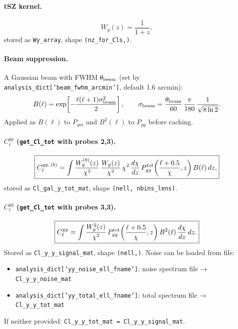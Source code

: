 \documentclass[12pt,a4paper]{article}
\newcommand{\code}[1]{\texttt{\small #1}}
\newcommand{\param}[1]{\texttt{\small #1}}
\begin{document}
\paragraph{tSZ kernel.}
\begin{equation}
  W_y(z) = \frac{1}{1+z},
\end{equation}
stored as \code{Wy\_array}, shape \code{(nz\_for\_Cls,)}.

\paragraph{Beam suppression.}
A Gaussian beam with FWHM $\theta_{\rm beam}$ (set by
\param{analysis\_dict['beam\_fwhm\_arcmin']}, default 1.6 arcmin):
\begin{equation}
  B(\ell) = \exp\!\left[-\frac{\ell(\ell+1)\sigma_{\rm beam}^2}{2}\right],
  \qquad \sigma_{\rm beam} = \frac{\theta_{\rm beam}}{60}\,\frac{\pi}{180}\,
  \frac{1}{\sqrt{8\ln 2}}.
\end{equation}
Applied as $B(\ell)$ to $P_{ym}$ and $B^2(\ell)$ to $P_{yy}$ before caching.

\paragraph{$C_\ell^{gy}$ (\code{get\_Cl\_tot} with probes 2,3).}
\begin{equation}
  \boxed{C_\ell^{gy,\,(b)} = \int
  \frac{W_g^{(b)}(z)}{\chi^2}
  \,\frac{W_y(z)}{\chi^2}
  \,\chi^2\,\frac{d\chi}{dz}\,
  P^{\rm tot}_{gy}\!\left(\frac{\ell+0.5}{\chi},z\right)B(\ell)\,dz,}
\end{equation}
stored as \code{Cl\_gal\_y\_tot\_mat}, shape \code{(nell, nbins\_lens)}.

\paragraph{$C_\ell^{yy}$ (\code{get\_Cl\_tot} with probes 3,3).}
\begin{equation}
  \boxed{C_\ell^{yy} = \int
  \frac{W_y^2(z)}{\chi^2}
  \,P^{\rm tot}_{yy}\!\left(\frac{\ell+0.5}{\chi},z\right)B^2(\ell)\,\frac{d\chi}{dz}\,dz.}
\end{equation}
Stored as \code{Cl\_y\_y\_signal\_mat}, shape \code{(nell,)}.
Noise can be loaded from file:
\begin{itemize}
  \item \param{analysis\_dict['yy\_noise\_ell\_fname']}: noise spectrum file → \code{Cl\_y\_y\_noise\_mat}
  \item \param{analysis\_dict['yy\_total\_ell\_fname']}: total spectrum file → \code{Cl\_y\_y\_tot\_mat}
\end{itemize}
If neither provided: \code{Cl\_y\_y\_tot\_mat = Cl\_y\_y\_signal\_mat}.
\end{document}
